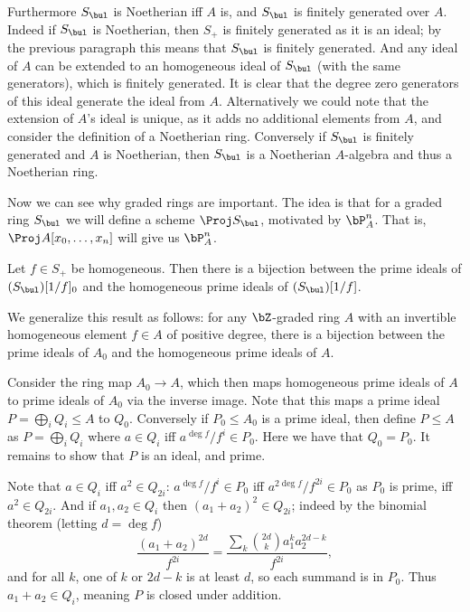 Furthermore $S_\bul$ is Noetherian iff $A$ is, and $S_\bul$ is finitely generated over $A$.
Indeed if $S_\bul$ is Noetherian, then $S_+$ is finitely generated as it is an ideal; by the previous paragraph this means that $S_\bul$ is finitely generated.
And any ideal of $A$ can be extended to an homogeneous ideal of $S_\bul$ (with the same generators), which is finitely generated.
It is clear that the degree zero generators of this ideal generate the ideal from $A$.
Alternatively we could note that the extension of $A$'s ideal is unique, as it adds no additional elements from $A$, and consider the definition of a Noetherian ring.
Conversely if $S_\bul$ is finitely generated and $A$ is Noetherian, then $S_\bul$ is a Noetherian $A$-algebra and thus a Noetherian ring.

Now we can see why graded rings are important.
The idea is that for a graded ring $S_\bul$ we will define a scheme $\Proj S_\bul$, motivated by $\bP^n_A$.
That is, $\Proj A[x_0,\dots,x_n]$ will give us $\bP^n_A$.

\bprop

    Let $f\in S_+$ be homogeneous.
    Then there is a bijection between the prime ideals of $(S_\bul)[1/f]_0$ and the homogeneous prime ideals of $(S_\bul)[1/f]$.

\eprop

\bproof

    We generalize this result as follows: for any $\bZ$-graded ring $A$ with an invertible homogeneous element $f\in A$ of positive degree,
    there is a bijection between the prime ideals of $A_0$ and the homogeneous prime ideals of $A$.

    Consider the ring map $A_0\to A$, which then maps homogeneous prime ideals of $A$ to prime ideals of $A_0$ via the inverse image.
    Note that this maps a prime ideal $P=\bigoplus_iQ_i\leq A$ to $Q_0$.
    Conversely if $P_0\leq A_0$ is a prime ideal, then define $P\leq A$ as $P=\bigoplus_iQ_i$ where $a\in Q_i$ iff $a^{\deg f}/f^i\in P_0$.
    Here we have that $Q_0=P_0$.
    It remains to show that $P$ is an ideal, and prime.

    Note that $a\in Q_i$ iff $a^2\in Q_{2i}$: $a^{\deg f}/f^i\in P_0$ iff $a^{2\deg f}/f^{2i}\in P_0$ as $P_0$ is prime, iff $a^2\in Q_{2i}$.
    And if $a_1,a_2\in Q_i$ then $(a_1+a_2)^2\in Q_{2i}$; indeed by the binomial theorem (letting $d=\deg f$)
    $$ \frac{(a_1+a_2)^{2d}}{f^{2i}} = \frac{\sum_k\binom{2d}ka_1^ka_2^{2d-k}}{f^{2i}} , $$
    and for all $k$, one of $k$ or $2d-k$ is at least $d$, so each summand is in $P_0$.
    Thus $a_1+a_2\in Q_i$, meaning $P$ is closed under addition.

